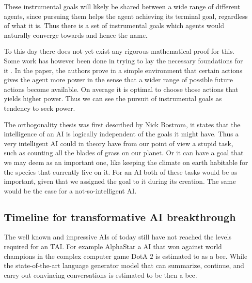 \documentclass[12pt,A4]{report}
\theoremstyle{definition}
\begin{document}
These instrumental goals will likely be shared between a wide range of different agents, since pursuing them helps the agent achieving its terminal goal, regardless of what it is. Thus there is a set of instrumental goals which agents would naturally converge towards and hence the name. 


To this day there does not yet exist any rigorous mathematical proof for this. Some work has however been done in trying to lay the necessary foundations for it \autocite{TURNER et al}. In the paper, the authors prove in a simple environment that certain actions gives the agent more power in the sense that a wider range of possible future actions become available. On average it is optimal to choose those actions that yields higher power. Thus we can see the pursuit of instrumental goals as tendency to seek power.

The orthogonality thesis was first described by Nick Bostrom\cite{Bostrom2}, it states that the intelligence of an AI is logically independent of the goals it might have. Thus a very intelligent AI could in theory have from our point of view a stupid task, such as counting all the blades of grass on our planet. Or it can have a goal that we may deem as an important one, like keeping the climate on earth habitable for the species that currently live on it. For an AI both of these tasks would be as important, given that we assigned the goal to it during its creation. The same would be the case for a not-so-intelligent AI.

\subsection{Timeline for transformative AI breakthrough}
The well known and impressive AIs of today still have not reached the levels required for an TAI. For example AlphaStar a AI that won against world champions in the complex computer game DotA 2\autocite{Deepmind} is estimated to  as a bee\autocite{A Cotra}. While the state-of-the-art language generator model that can summarize, continue, and carry out convincing conversations is estimated to be  then a bee\autocite{A Cotra}.
\end{document}
